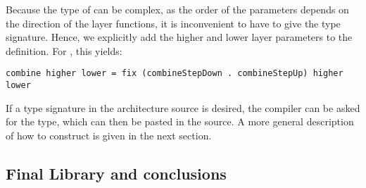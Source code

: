 \documentclass[preprint,natbib]{sigplanconf}
\begin{document}
Because the type of  can be complex, as the order of the parameters depends on the direction of the layer functions, it is inconvenient to have to give the type signature. Hence, we explicitly add the  higher and lower layer parameters to the definition. For , this yields: 

\begin{small}
\begin{verbatim}
combine higher lower = fix (combineStepDown . combineStepUp) higher lower
\end{verbatim}
\end{small}

If a type signature in the architecture source is desired, the compiler can be asked for the type, which can then be pasted in the source. A more general description of how to construct  is given in the next section.

%																
\subsection{Final Library and conclusions} \label{sect:libAndConclusions}
\end{document}
